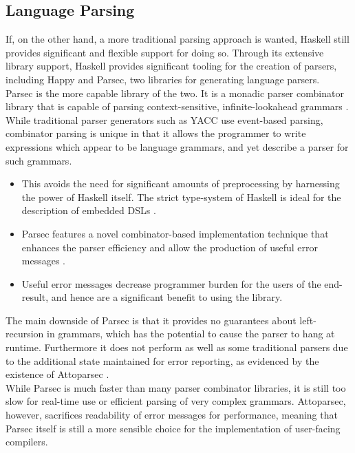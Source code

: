 
\subsection{Language Parsing} %
\label{sub:language_parsing}
If, on the other hand, a more traditional parsing approach is wanted, Haskell still provides significant and flexible support for doing so. 
Through its extensive library support, Haskell provides significant tooling for the creation of parsers, including Happy and Parsec, two libraries for generating language parsers. \\

Parsec is the more capable library of the two.
It is a monadic parser combinator library that is capable of parsing context-sensitive, infinite-lookahead grammars \citep{leijen2001parsec}.
While traditional parser generators such as YACC use event-based parsing, combinator parsing is unique in that it allows the programmer to write expressions which appear to be language grammars, and yet describe a parser for such grammars.
\begin{itemize}
    \item This avoids the need for significant amounts of preprocessing by harnessing the power of Haskell itself. 
    The strict type-system of Haskell is ideal for the description of embedded DSLs \citep{swierstra2009combinator}.
    \item Parsec features a novel combinator-based implementation technique that enhances the parser efficiency and allow the production of useful error messages \citep{leijen2002parsec}.
    \item Useful error messages decrease programmer burden for the users of the end-result, and hence are a significant benefit to using the library. 
\end{itemize}

The main downside of Parsec is that it provides no guarantees about left-recursion in grammars, which has the potential to cause the parser to hang at runtime. 
Furthermore it does not perform as well as some traditional parsers due to the additional state maintained for error reporting, as evidenced by the existence of Attoparsec \citep{gummelt2011hindsight}. \\

While Parsec is much faster than many parser combinator libraries, it is still too slow for real-time use or efficient parsing of very complex grammars. 
Attoparsec, however, sacrifices readability of error messages for performance, meaning that Parsec itself is still a more sensible choice for the implementation of user-facing compilers. \\

